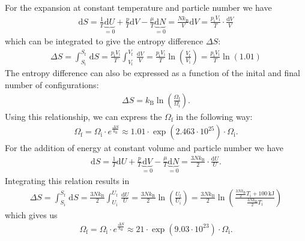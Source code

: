 \documentclass[a4paper,10pt,bibtotoc]{scrartcl}
\begin{document}
For the expansion at constant temperature and particle number we have
\begin{align}
 \mathrm{d}S = \frac{1}{T}\underbrace{\mathrm{d}U}_{=0} + \frac{p}{T}\mathrm{d}V - \frac{\mu}{T}\underbrace{\mathrm{d}N}_{=0} = \frac{Nk_\mathrm{B}}{V}\mathrm{d}V = \frac{p_\mathrm{i} V_\mathrm{i}}{T}\cdot\frac{\mathrm{d}V}{V}
\end{align}
which can be integrated to give the entropy difference $\Delta S$:
\begin{align}
 \Delta S = \int_{S_\mathrm{i}}^{S_\mathrm{f}}\,\mathrm{d}S = \frac{p_\mathrm{i} V_\mathrm{i}}{T}\int_{V_\mathrm{i}}^{V_\mathrm{f}}\,\frac{\mathrm{d} V}{V} = \frac{p_\mathrm{i} V_\mathrm{i}}{T}\ln\left(\frac{V_\mathrm{f}}{V_\mathrm{i}}\right) = \frac{p_\mathrm{i} V_\mathrm{i}}{T}\ln\left(1.01\right)
\end{align}
The entropy difference can also be expressed as a function of the inital and final number of configurations:
\begin{align}
\Delta S = k_\mathrm{B}\ln\left(\frac{\Omega_\mathrm{f}}{\Omega_\mathrm{i}}\right).
\end{align}
Using this relationship, we can express the $\Omega_\mathrm{f}$ in the following way:
\begin{align}
 \Omega_\mathrm{f} = \Omega_\mathrm{i}\cdot e^{\frac{\Delta S}{k_\mathrm{B}}} \approx 1.01\cdot \exp\left(2.463\cdot 10^{25}\right)\cdot \Omega_\mathrm{i}.
\end{align}
For the addition of energy at constant volume and particle number we have
\begin{align}
 \mathrm{d}S = \frac{1}{T}\mathrm{d}U + \frac{p}{T}\underbrace{\mathrm{d}V}_{=0} - \frac{\mu}{T}\underbrace{\mathrm{d}N}_{=0} = \frac{3Nk_\mathrm{B}}{2}\cdot\frac{\mathrm{d}U}{U}.
\end{align}
Integrating this relation results in
\begin{align}
 \Delta S = \int_{S_\mathrm{i}}^{S_\mathrm{f}}\,\mathrm{d}S = \frac{3Nk_\mathrm{B}}{2}\int_{U_\mathrm{i}}^{U_\mathrm{f}}\,\frac{\mathrm{d} U}{U} = \frac{3Nk_\mathrm{B}}{2}\ln\left(\frac{U_\mathrm{f}}{U_\mathrm{i}}\right) = \frac{3Nk_\mathrm{B}}{2}\ln\left(\frac{\frac{3Nk_\mathrm{B}}{2}T_\mathrm{i} + 100\,\mathrm{kJ}}{\frac{3Nk_\mathrm{B}}{2}T_\mathrm{i}}\right)
\end{align}
which gives us
\begin{align}
 \Omega_\mathrm{f} = \Omega_\mathrm{i}\cdot e^{\frac{\Delta S}{k_\mathrm{B}}} \approx 21\cdot \exp\left(9.03\cdot 10^{23}\right)\cdot \Omega_\mathrm{i}.
\end{align}
\end{document}

